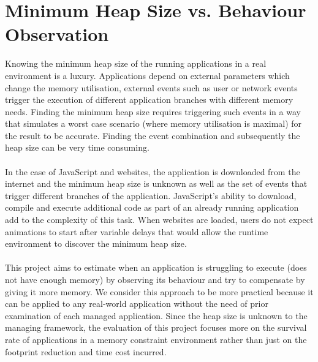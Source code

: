 \documentclass{l4proj}
\begin{document}
\section{Minimum Heap Size vs. Behaviour Observation}
\label{noheapsize}
\hspace*{1em} Knowing the minimum heap size of the running applications in a real environment is a luxury. Applications depend on external parameters which change the memory utilisation, external events such as user or network events trigger the execution of different application branches with different memory needs. Finding the minimum heap size requires triggering such events in a way that simulates a worst case scenario (where memory utilisation is maximal) for the result to be accurate. Finding the event combination and subsequently the heap size can be very time consuming. 
\\\\
\hspace*{1em}  In the case of JavaScript and websites, the application is downloaded from the internet and the minimum heap size is unknown as well as the set of events that trigger different branches of the application. JavaScript's ability to download, compile and execute additional code as part of an already running application add to the complexity of this task. When websites are loaded, users do not expect animations to start after variable delays that would allow the runtime environment to discover the minimum heap size.
\\\\
\hspace*{1em} This project aims to estimate when an application is struggling to execute (does not have enough memory) by observing its behaviour and try to compensate by giving it more memory. We consider this approach to be more practical because it can be applied to any real-world application without the need of prior examination of each managed application. Since the heap size is unknown to the managing framework, the evaluation of this project focuses more on the survival rate of applications in a memory constraint environment rather than just on the footprint reduction and time cost incurred.
\end{document}
